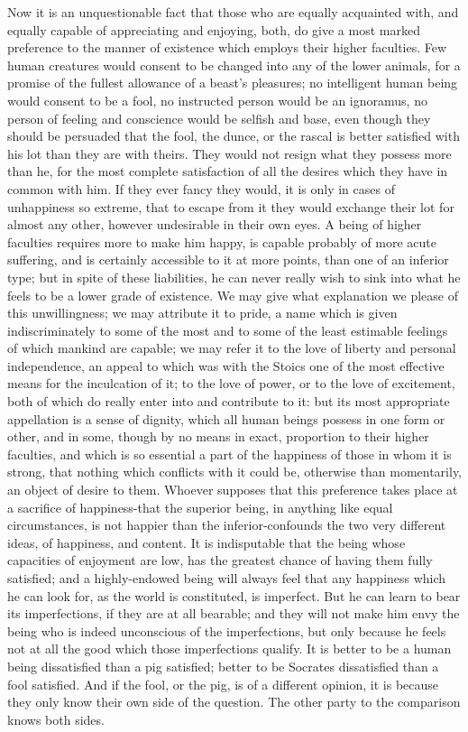\documentclass[12pt]{report}
\begin{document}
Now it is an unquestionable fact that those who are equally acquainted with, and equally capable of appreciating and enjoying, both, do give a most marked preference to the manner of existence which employs their higher faculties. Few human creatures would consent to be changed into any of the lower animals, for a promise of the fullest allowance of a beast's pleasures; no intelligent human being would consent to be a fool, no instructed person would be an ignoramus, no person of feeling and conscience would be selfish and base, even though they should be persuaded that the fool, the dunce, or the rascal is better satisfied with his lot than they are with theirs. They would not resign what they possess more than he, for the most complete satisfaction of all the desires which they have in common with him. If they ever fancy they would, it is only in cases of unhappiness so extreme, that to escape from it they would exchange their lot for almost any other, however undesirable in their own eyes. A being of higher faculties requires more to make him happy, is capable probably of more acute suffering, and is certainly accessible to it at more points, than one of an inferior type; but in spite of these liabilities, he can never really wish to sink into what he feels to be a lower grade of existence. We may give what explanation we please of this unwillingness; we may attribute it to pride, a name which is given indiscriminately to some of the most and to some of the least estimable feelings of which mankind are capable; we may refer it to the love of liberty and personal independence, an appeal to which was with the Stoics one of the most effective means for the inculcation of it; to the love of power, or to the love of excitement, both of which do really enter into and contribute to it: but its most appropriate appellation is a sense of dignity, which all human beings possess in one form or other, and in some, though by no means in exact, proportion to their higher faculties, and which is so essential a part of the happiness of those in whom it is strong, that nothing which conflicts with it could be, otherwise than momentarily, an object of desire to them. Whoever supposes that this preference takes place at a sacrifice of happiness-that the superior being, in anything like equal circumstances, is not happier than the inferior-confounds the two very different ideas, of happiness, and content. It is indisputable that the being whose capacities of enjoyment are low, has the greatest chance of having them fully satisfied; and a highly-endowed being will always feel that any happiness which he can look for, as the world is constituted, is imperfect. But he can learn to bear its imperfections, if they are at all bearable; and they will not make him envy the being who is indeed unconscious of the imperfections, but only because he feels not at all the good which those imperfections qualify. It is better to be a human being dissatisfied than a pig satisfied; better to be Socrates dissatisfied than a fool satisfied. And if the fool, or the pig, is of a different opinion, it is because they only know their own side of the question. The other party to the comparison knows both sides.
\end{document}
